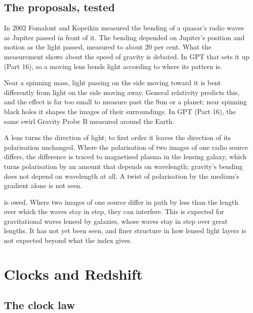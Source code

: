 \documentclass[11pt,a4paper]{article}
\begin{document}
\subsection{The proposals, tested}

 In 2002 Fomalont and Kopeikin measured the bending of a quasar's radio waves as Jupiter passed in front of it. The bending depended on Jupiter's position and motion as the light passed, measured to about 20 per cent. What the measurement shows about the speed of gravity is debated. In GPT  that sets it up (Part 16), so a moving lens bends light according to where its pattern is.

 Near a spinning mass, light passing on the side moving toward it is bent differently from light on the side moving away. General relativity predicts this, and the effect is far too small to measure past the Sun or a planet; near spinning black holes it shapes the images of their surroundings. In GPT  (Part 16), the same swirl Gravity Probe B measured around the Earth.

 A lens turns the direction of light; to first order it leaves the direction of its polarisation unchanged. Where the polarisation of two images of one radio source differs, the difference is traced to magnetised plasma in the lensing galaxy, which turns polarisation by an amount that depends on wavelength; gravity's bending does not depend on wavelength at all. A twist of polarisation by the medium's gradient alone is not seen.

 is owed. Where two images of one source differ in path by less than the length over which the waves stay in step, they can interfere. This is expected for gravitational waves lensed by galaxies, whose waves stay in step over great lengths. It has not yet been seen, and finer structure in how lensed light layers is not expected beyond what the index gives.

\section{Clocks and Redshift}

\subsection{The clock law}
\end{document}
